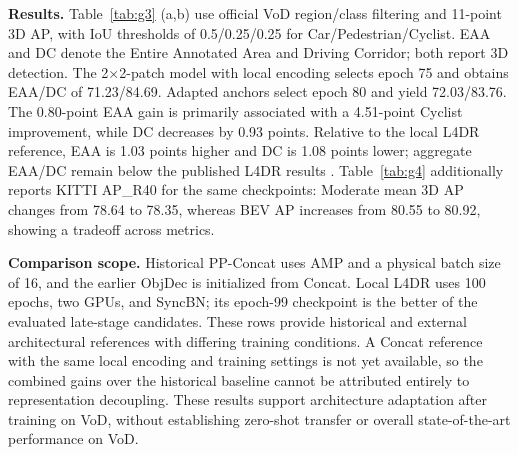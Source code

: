 \textbf{Results.} Table~\ref{tab:g3} (a,b) use official VoD region/class filtering and 11-point 3D AP, with IoU thresholds of 0.5/0.25/0.25 for Car/Pedestrian/Cyclist. EAA and DC denote the Entire Annotated Area and Driving Corridor; both report 3D detection. The 2\(\times\)2-patch model with local encoding selects epoch 75 and obtains EAA/DC of 71.23/84.69. Adapted anchors select epoch 80 and yield 72.03/83.76. The 0.80-point EAA gain is primarily associated with a 4.51-point Cyclist improvement, while DC decreases by 0.93 points. Relative to the local L4DR reference, EAA is 1.03 points higher and DC is 1.08 points lower; aggregate EAA/DC remain below the published L4DR results \citep{huang2025l4dr}. Table~\ref{tab:g4} additionally reports KITTI AP\_R40 for the same checkpoints: Moderate mean 3D AP changes from 78.64 to 78.35, whereas BEV AP increases from 80.55 to 80.92, showing a tradeoff across metrics.

\textbf{Comparison scope.} Historical PP-Concat uses AMP and a physical batch size of 16, and the earlier ObjDec is initialized from Concat. Local L4DR uses 100 epochs, two GPUs, and SyncBN; its epoch-99 checkpoint is the better of the evaluated late-stage candidates. These rows provide historical and external architectural references with differing training conditions. A Concat reference with the same local encoding and training settings is not yet available, so the combined gains over the historical baseline cannot be attributed entirely to representation decoupling. These results support architecture adaptation after training on VoD, without establishing zero-shot transfer or overall state-of-the-art performance on VoD.










